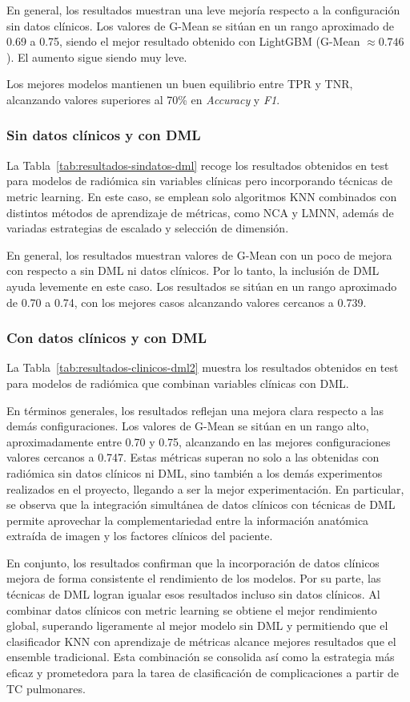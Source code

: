 En general, los resultados muestran una leve mejoría respecto a la configuración sin datos clínicos. Los valores de G-Mean se sitúan en un rango aproximado de 0.69 a 0.75, siendo el mejor resultado obtenido con LightGBM (G-Mean $\approx 0.746$). El aumento sigue siendo muy leve.

Los mejores modelos mantienen un buen equilibrio entre TPR y TNR, alcanzando valores superiores al 70\% en \textit{Accuracy} y \textit{F1}. 

\subsubsection{Sin datos clínicos y con DML}
La Tabla~\ref{tab:resultados-sindatos-dml} recoge los resultados obtenidos en test para modelos de radiómica sin variables clínicas pero incorporando técnicas de metric learning. En este caso, se emplean solo algoritmos KNN combinados con distintos métodos de aprendizaje de métricas, como NCA y LMNN, además de variadas estrategias de escalado y selección de dimensión.

En general, los resultados muestran valores de G-Mean con un poco de mejora con respecto a sin DML ni datos clínicos. Por lo tanto, la inclusión de DML ayuda levemente en este caso. Los resultados se sitúan en un rango aproximado de 0.70 a 0.74, con los mejores casos alcanzando valores cercanos a 0.739.


\subsubsection{Con datos clínicos y con DML}
La Tabla~\ref{tab:resultados-clinicos-dml2} muestra los resultados obtenidos en test para modelos de radiómica que combinan variables clínicas con DML.

En términos generales, los resultados reflejan una mejora clara respecto a las demás configuraciones. Los valores de G-Mean se sitúan en un rango alto, aproximadamente entre 0.70 y 0.75, alcanzando en las mejores configuraciones valores cercanos a 0.747. Estas métricas superan no solo a las obtenidas con radiómica sin datos clínicos ni DML, sino también a los demás experimentos realizados en el proyecto, llegando a ser la mejor experimentación. En particular, se observa que la integración simultánea de datos clínicos con técnicas de DML permite aprovechar la complementariedad entre la información anatómica extraída de imagen y los factores clínicos del paciente.

En conjunto, los resultados confirman que la incorporación de datos clínicos mejora de forma consistente el rendimiento de los modelos. Por su parte, las técnicas de DML logran igualar esos resultados incluso sin datos clínicos. Al combinar datos clínicos con metric learning se obtiene el mejor rendimiento global, superando ligeramente al mejor modelo sin DML y permitiendo que el clasificador KNN con aprendizaje de métricas alcance mejores resultados que el ensemble tradicional. Esta combinación se consolida así como la estrategia más eficaz y prometedora para la tarea de clasificación de complicaciones a partir de TC pulmonares.

